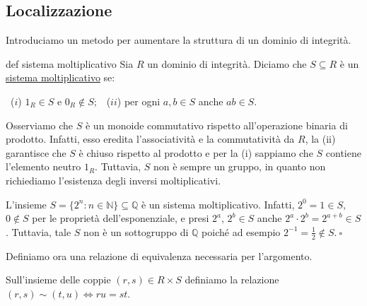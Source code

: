 \subsection{Localizzazione}

\noindent Introduciamo un metodo per aumentare la struttura di un dominio di integrità.

\begin{defn}{def sistema moltiplicativo}
  Sia $R$ un dominio di integrità. Diciamo che $S\subseteq R$ è un \underline{sistema moltiplicativo} se:

  \noindent \ ($i$) $1_R\in S$ e $0_R\not\in S;$
  \noindent \ ($ii$) per ogni $a,b\in S$ anche $ab\in S$.
\end{defn}

\noindent Osserviamo che $S$ è un monoide commutativo rispetto all'operazione binaria di prodotto. 
Infatti, esso eredita l'associatività e la commutatività da $R$, la (ii) garantisce che $S$ è chiuso rispetto al prodotto e 
per la (i) sappiamo che $S$ contiene l'elemento neutro $1_R$. Tuttavia, $S$ non è sempre un gruppo, 
in quanto non richiediamo l'esistenza degli inversi moltiplicativi.

\begin{exm}
  L'insieme $S=\{2^n : n\in \mathbb{N}\}\subseteq \mathbb{Q}$ è un sistema moltiplicativo. 
  Infatti, $2^0=1\in S,$ $0\not\in S$ per le proprietà dell'esponenziale, e presi $2^a,\,2^b \in S$ anche $2^a\cdot 2^b=2^{a+b}\in S$. 
  Tuttavia, tale $S$ non è un sottogruppo di $\mathbb{Q}$ poiché ad esempio $2^{-1}=\frac{1}{2}\not\in S. \ \square$
\end{exm}

\noindent Definiamo ora una relazione di equivalenza necessaria per l'argomento.

\noindent Sull'insieme delle coppie $(r,s)\in R\times S$ definiamo la relazione $(r,s)\sim (t,u)\Leftrightarrow ru=st$.

